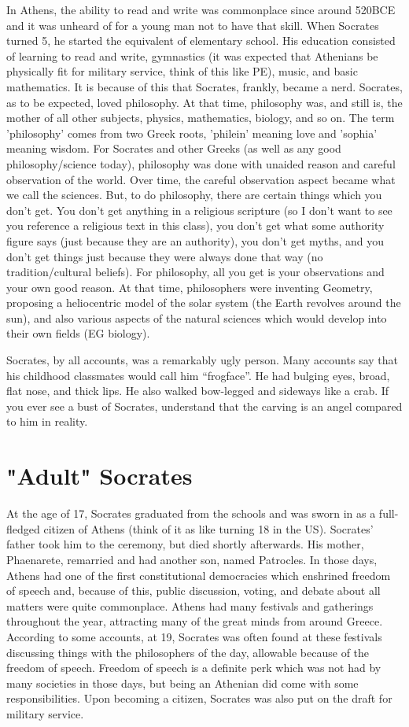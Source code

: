 In Athens, the ability to read and write was commonplace since around 520BCE and it was unheard of for a young man not to have that skill. When Socrates turned 5, he started the equivalent of elementary school. His education consisted of learning to read and write, gymnastics (it was expected that Athenians be physically fit for military service, think of this like PE), music, and basic mathematics. It is because of this that Socrates, frankly, became a nerd. Socrates, as to be expected, loved philosophy. At that time, philosophy was, and still is, the mother of all other subjects, physics, mathematics, biology, and so on. The term 'philosophy' comes from two Greek roots, 'philein' meaning love and 'sophia' meaning wisdom. For Socrates and other Greeks (as well as any good philosophy/science today), philosophy was done with unaided reason and careful observation of the world. Over time, the careful observation aspect became what we call the sciences. But, to do philosophy, there are certain things which you don't get. You don't get anything in a religious scripture (so I don't want to see you reference a religious text in this class), you don't get what some authority figure says (just because they are an authority), you don't get myths, and you don't get things just because they were always done that way (no tradition/cultural beliefs). For philosophy, all you get is your observations and your own good reason. At that time, philosophers were inventing Geometry, proposing a heliocentric model of the solar system (the Earth revolves around the sun), and also various aspects of the natural sciences which would develop into their own fields (EG biology).

Socrates, by all accounts, was a remarkably ugly person. Many accounts say that his childhood classmates would call him “frogface”. He had bulging eyes, broad, flat nose, and thick lips. He also walked bow-legged and sideways like a crab. If you ever see a bust of Socrates, understand that the carving is an angel compared to him in reality.
\section{"Adult" Socrates}

At the age of 17, Socrates graduated from the schools and was sworn in as a full-fledged citizen of Athens (think of it as like turning 18 in the US). Socrates' father took him to the ceremony, but died shortly afterwards. His mother, Phaenarete, remarried and had another son, named Patrocles.  In those days, Athens had one of the first constitutional democracies which enshrined freedom of speech and, because of this, public discussion, voting, and debate about all matters were quite commonplace. Athens had many festivals and gatherings throughout the year, attracting many of the great minds from around Greece. According to some accounts, at 19, Socrates was often found at these festivals discussing things with the philosophers of the day, allowable because of the freedom of speech. Freedom of speech is a definite perk which was not had by many societies in those days, but being an Athenian did come with some responsibilities. Upon becoming a citizen, Socrates was also put on the draft for military service.
